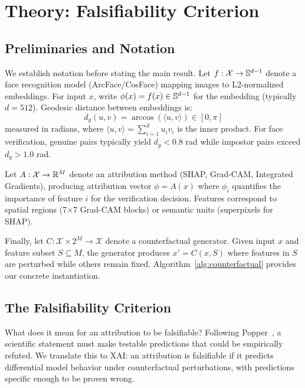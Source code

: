 \section{Theory: Falsifiability Criterion}
\label{sec:theory}

\subsection{Preliminaries and Notation}

We establish notation before stating the main result. Let $f: \mathcal{X} \to \mathbb{S}^{d-1}$ denote a face recognition model (ArcFace/CosFace) mapping images to L2-normalized embeddings. For input $x$, write $\phi(x) = f(x) \in \mathbb{S}^{d-1}$ for the embedding (typically $d=512$). Geodesic distance between embeddings is:
\begin{equation}
d_g(u,v) = \arccos(\langle u, v \rangle) \in [0, \pi]
\end{equation}
measured in radians, where $\langle u, v \rangle = \sum_{i=1}^d u_i v_i$ is the inner product. For face verification, genuine pairs typically yield $d_g < 0.8$ rad while impostor pairs exceed $d_g > 1.0$ rad.

Let $A: \mathcal{X} \to \mathbb{R}^M$ denote an attribution method (SHAP, Grad-CAM, Integrated Gradients), producing attribution vector $\phi = A(x)$ where $\phi_i$ quantifies the importance of feature $i$ for the verification decision. Features correspond to spatial regions (7$\times$7 Grad-CAM blocks) or semantic units (superpixels for SHAP).

Finally, let $C: \mathcal{X} \times 2^M \to \mathcal{X}$ denote a counterfactual generator. Given input $x$ and feature subset $S \subseteq M$, the generator produces $x' = C(x, S)$ where features in $S$ are perturbed while others remain fixed. Algorithm~\ref{alg:counterfactual} provides our concrete instantiation.

\subsection{The Falsifiability Criterion}

What does it mean for an attribution to be falsifiable? Following Popper~\citep{popper1959logic}, a scientific statement must make testable predictions that could be empirically refuted. We translate this to XAI: an attribution is falsifiable if it predicts differential model behavior under counterfactual perturbations, with predictions specific enough to be proven wrong.

